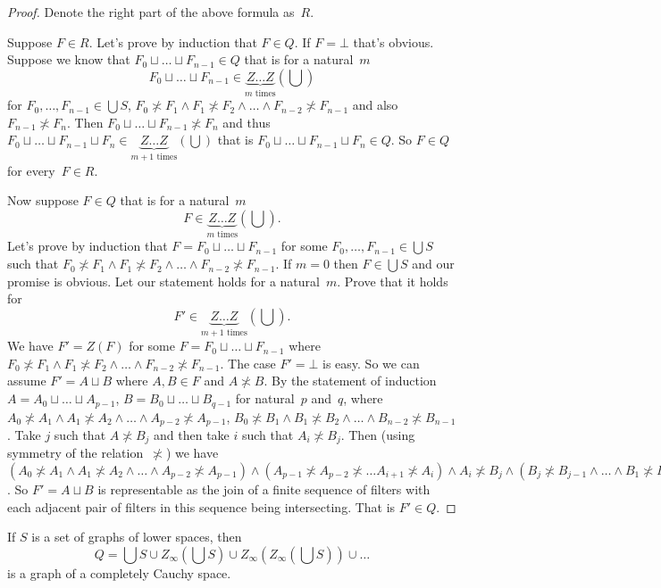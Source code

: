 \begin{proof}
Denote the right part of the above formula as~$R$.

Suppose $F\in R$. Let's prove by induction that $F\in Q$. If $F=\bot$ that's obvious. Suppose we know that
$F_0\sqcup\dots\sqcup F_{n-1}\in Q$ that is for a natural~$m$
\[F_0\sqcup\dots\sqcup F_{n-1}\in \underbrace{Z\dots Z}_{m\text{ times}}\left(\bigcup \right)\]
for $F_0,\dots,F_{n-1}\in\bigcup S$, $F_0\nasymp F_1\land F_1\nasymp F_2\land\dots\land F_{n-2}\nasymp F_{n-1}$
and also $F_{n-1}\nasymp F_n$. Then $F_0\sqcup\dots\sqcup F_{n-1}\nasymp F_n$ and thus
$F_0\sqcup\dots\sqcup F_{n-1}\sqcup F_n\in \underbrace{Z\dots Z}_{m+1\text{ times}}\left(\bigcup \right)$ that is
$F_0\sqcup\dots\sqcup F_{n-1}\sqcup F_n\in Q$. So $F\in Q$ for every~$F\in R$.

Now suppose $F\in Q$ that is for a natural~$m$
\[F \in \underbrace{Z\dots Z}_{m\text{ times}}\left(\bigcup \right).\]
Let's prove by induction that $F=F_0\sqcup\dots\sqcup F_{n-1}$ for some $F_0,\dots,F_{n-1}\in\bigcup S$
such that $F_0\nasymp F_1\land F_1\nasymp F_2\land\dots\land F_{n-2}\nasymp F_{n-1}$.
If $m=0$ then $F\in\bigcup S$ and our promise is obvious.
Let our statement holds for a natural~$m$. Prove that it holds for
\[F' \in \underbrace{Z\dots Z}_{m+1\text{ times}}\left(\bigcup \right).\]
We have $F'=Z(F)$ for some $F=F_0\sqcup\dots\sqcup F_{n-1}$ where $F_0\nasymp F_1\land F_1\nasymp F_2\land\dots\land F_{n-2}\nasymp F_{n-1}$.
The case $F'=\bot$ is easy. So we can assume $F'=A\sqcup B$ where $A,B\in F$ and $A\nasymp B$.
By the statement of induction $A=A_0\sqcup\dots\sqcup A_{p-1}$, $B=B_0\sqcup\dots\sqcup B_{q-1}$ for natural~$p$ and~$q$,
where $A_0\nasymp A_1\land A_1\nasymp A_2\land\dots\land A_{p-2}\nasymp A_{p-1}$,
$B_0\nasymp B_1\land B_1\nasymp B_2\land\dots\land B_{n-2}\nasymp B_{n-1}$.
Take $j$ such that $A\nasymp B_j$ and then take $i$ such that $A_i\nasymp B_j$.
Then (using symmetry of the relation~$\nasymp$) we have
$(A_0\nasymp A_1\land A_1\nasymp A_2\land\dots\land A_{p-2}\nasymp A_{p-1}) \land
(A_{p-1} \nasymp A_{p-2} \nasymp \dots A_{i+1} \nasymp A_i) \land A_i \nasymp B_j \land
(B_j \nasymp B_{j-1} \land \dots \land B_1\nasymp B_0) \land
(B_0\nasymp B_1\land B_1\nasymp B_2\land\dots\land B_{q-2}\nasymp B_{q-1})$.
So $F'=A\sqcup B$ is representable as the join of a finite sequence of filters with each adjacent pair of filters in this sequence being intersecting.
That is $F'\in Q$.
\end{proof}

\begin{lem}
If $S$ is a set of graphs of lower spaces, then
\[
Q = \bigcup S \cup Z_{\infty}\left(\bigcup S\right) \cup Z_{\infty}\left(Z_{\infty}\left(\bigcup S\right)\right) \cup \dots
\]
is a graph of a completely Cauchy space.
\end{lem}

